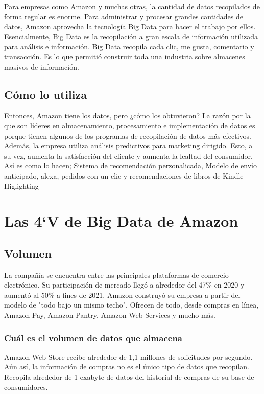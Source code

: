 Para empresas como Amazon y muchas otras, la cantidad de datos recopilados de forma regular es enorme. Para administrar y procesar grandes cantidades de datos, Amazon aprovecha la tecnología Big Data para hacer el trabajo por ellos. Esencialmente, Big Data es la recopilación a gran escala de información utilizada para análisis e información. Big Data recopila cada clic, me gusta, comentario y transacción. Es lo que permitió construir toda una industria sobre almacenes masivos de información.


\subsection{Cómo lo utiliza}
Entonces, Amazon tiene los datos, pero ¿cómo los obtuvieron? La razón por la que son líderes en almacenamiento, procesamiento e implementación de datos es porque tienen algunos de los programas de recopilación de datos más efectivos. Además, la empresa utiliza análisis predictivos para marketing dirigido. Esto, a su vez, aumenta la satisfacción del cliente y aumenta la lealtad del consumidor. Así es como lo hacen; Sistema de recomendación perzonalicada, Modelo de envío anticipado, alexa, pedidos con un clic y recomendaciones de libros de Kindle Higlighting

\clearpage
\section{Las 4`V de Big Data de Amazon }
\subsection{Volumen}
La compañía se encuentra entre las principales plataformas de comercio electrónico. Su participación de mercado llegó a alrededor del 47$\%$ en 2020 y aumentó al 50$\%$ a fines de 2021. Amazon construyó su empresa a partir del modelo de "todo bajo un mismo techo". Ofrecen de todo, desde compras en línea, Amazon Pay, Amazon Pantry, Amazon Web Services y mucho más.


\subsubsection{Cuál es el volumen de datos que almacena}
Amazon Web Store recibe alrededor de 1,1 millones de solicitudes por segundo. Aún así, la información de compras no es el único tipo de datos que recopilan. Recopila alrededor de 1 exabyte de datos del historial de compras de su base de consumidores.

